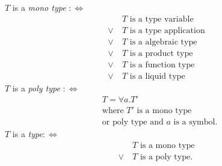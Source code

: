 \documentclass[]{scrbook}
\theoremstyle{definition}
\theoremstyle{definition}
\theoremstyle{definition}
\theoremstyle{remark}
\begin{document}
\(T\) is a \emph{mono type} \(:\Leftrightarrow\) \[
\begin{aligned}
         & T \text{ is a type variable}\\
  \lor \ & T \text{ is a type application}\\
  \lor \ & T \text{ is a algebraic type}\\
  \lor \ & T \text{ is a product type}\\
  \lor \ & T \text{ is a function type}\\
  \lor \ & T \text{ is a liquid type }
\end{aligned}
\] \(T\) is a \emph{poly type} \(:\Leftrightarrow\) \[
\begin{aligned}
         & T = \forall a.T'\\
         & \text{where } T' \text{ is a mono type}\\
         & \text{or poly type and } a \text{ is a symbol.}
\end{aligned}
\] \(T\) is a \emph{type}\(:\Leftrightarrow\) \[
\begin{aligned}
       \ & T \text{ is a mono type}\\
  \lor \ & T \text{ is a poly type}.
\end{aligned}
\]\\
\end{document}
